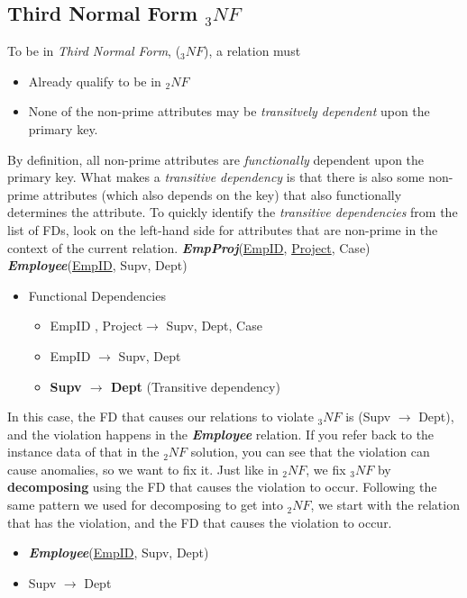 \documentclass{report}
\begin{document}
\subsection{Third Normal Form $_3NF$}
To be in \textit{Third Normal Form}, ($_3NF$), a relation must
\begin{itemize}
    \item Already qualify to be in $_2NF$
    \item None of the non-prime attributes may be \textit{transitvely dependent} upon the primary key.
\end{itemize}
By definition, all non-prime attributes are \textit{functionally} dependent upon the primary key. What makes a \textit{transitive dependency} is that there is also some non-prime attributes (which also depends on the key) that also functionally determines the attribute.
\bigbreak \noindent
To quickly identify the \textit{transitive dependencies} from the list of FDs, look on the left-hand side for attributes that are non-prime in the context of the current relation.
\bigbreak \noindent
\textit{\textbf{EmpProj}}(\underline{EmpID}, \underline{Project}, Case) \vspace{1.5mm}\\
\textit{\textbf{Employee}}(\underline{EmpID}, Supv, Dept)
\begin{itemize}
    \item Functional Dependencies
        \begin{itemize}[label=$\circ$]
            \item EmpID , Project$\rightarrow$ Supv, Dept, Case
            \item EmpID $\rightarrow$ Supv, Dept
            \item \textbf{Supv $\rightarrow$ Dept} (Transitive dependency)
        \end{itemize}
\end{itemize}
In this case, the FD that causes our relations to violate $_3NF$ is (Supv $\rightarrow$ Dept), and the violation happens in the \textit{\textbf{Employee}} relation. If you refer back to the instance data of that in the $_2NF$ solution, you can see that the violation can cause anomalies, so we want to fix it.
\bigbreak \noindent
Just like in $_2NF$, we fix $_3NF$ by \textbf{decomposing} using the FD that causes the violation to occur.
Following the same pattern we used for decomposing to get into $_2NF$, we start with the relation that has the violation, and the FD that causes the violation to occur.
\begin{itemize}
    \item \textit{\textbf{Employee}}(\underline{EmpID}, Supv, Dept)
    \item Supv $\rightarrow$ Dept
\end{itemize}
\end{document}
